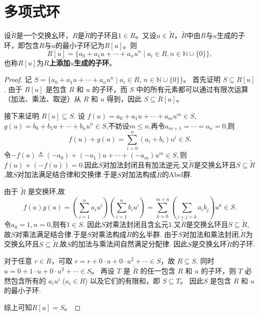 \documentclass[../../main.tex]{subfiles}%
\begin{document}
\section{多项式环}

\begin{theorem}
设\( \widetilde{R} \)是一个交换幺环，\( R \)是\( \widetilde{R} \)的子环且\( 1 \in R \)。又设\( u \in \widetilde{R} \)，\( \widetilde{R} \)中由\( R \)与\( u \)生成的子环，即包含\( R \)与\( u \)的最小子环记为\( R[u] \)。则
\[
R[u] = \{a_0 + a_1 u + \cdots + a_n u^n \mid a_i \in R, n \in \mathbb{N}\cup\{0\}\},
\]
也称\( R[u] \)为\textbf{\( R \)上添加\( u \)生成的子环}。
\end{theorem}
\begin{proof}

记 $S = \{a_0 + a_1 u + \cdots + a_n u^n \mid a_i \in R, \,  n \in \mathbb{N}\cup\{0\}\}$。
首先证明 $S \subseteq R[u]$.
由于 $R[u]$ 是包含 $R$ 和 $u$ 的子环，而 $S$ 中的所有元素都可以通过有限次运算（加法、乘法、取逆）从 $R$ 和 $u$ 得到，因此 $S \subseteq R[u]$。

接下来证明 $R[u] \subseteq S$.
设 $f(u) = a_0 + a_1 u + \cdots + a_m u^m \in S$,$g(u) = b_0 + b_1 u + \cdots + b_n u^n \in S$,不妨设$m\leqslant n$,再令$a_{m+1}=\cdots=a_n=0$,则
$$f(u) + g(u) = \sum_{i=0}^n (a_i + b_i)u^i \in S.$$
令$-f(u) \triangleq  (-a_0) + (-a_1)u + \cdots + (-a_m)u^m \in S,$则$f(u)+(-f(u))=0.$因此$S$对加法封闭且有加法逆元.又$\widetilde{R}$是交换幺环且$S\subseteq \widetilde{R}$,故$S$对加法满足结合律和交换律.于是$S$对加法构成$\widetilde{R}$的Abel群.

由于 $\widetilde{R}$ 是交换环,故
$$
f\left( u \right) g\left( u \right) =\left( \sum_{i=1}^n{a_iu^i} \right) \left( \sum_{i=1}^n{b_iu^i} \right) =\sum_{k=0}^{m+n}{\left( \sum_{i+j=k}{a_ib_j} \right) u^k}\in S.
$$
令$a_0=1,n=0$,则有$1\in S.$
因此$S$对乘法封闭且含幺元$1$.又$\widetilde{R}$是交换幺环且$S\subseteq \widetilde{R}$,故$S$对乘法满足结合律.于是$S$对乘法构成$\widetilde{R}$的幺半群.
由于$S$对加法和乘法封闭,$\widetilde{R}$为交换幺环且$S\subseteq \widetilde{R}$,故$S$的加法与乘法间自然满足分配律.
因此$S$是交换幺环$\widetilde{R}$的子环.

对于任意 $r \in R$，可取 $r = r + 0\cdot u + 0\cdot u^2 + \cdots \in S$，故 $R \subseteq S$.
同时 $u = 0 + 1\cdot u + 0\cdot u^2 + \cdots \in S$。
再设 $T$ 是 $\widetilde{R}$ 的任一包含 $R$ 和 $u$ 的子环，则 $T$ 必然包含所有的 $a_i u^i$ ($a_i \in R$) 以及它们的有限和，即 $S \subseteq T$。
因此$S$ 是包含 $R$ 和 $u$ 的最小子环.

综上可知$R[u] = S$。

\end{proof}
\end{document}
